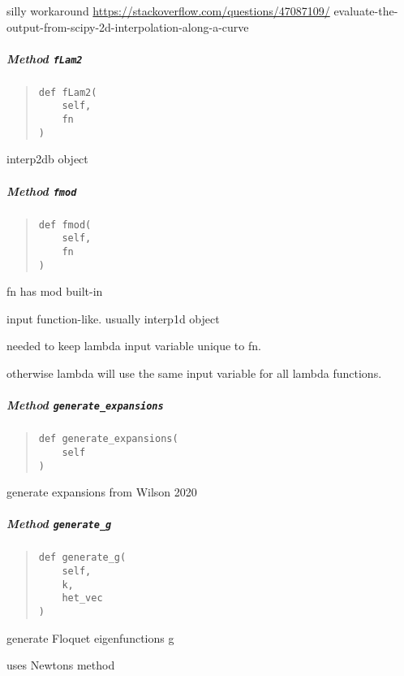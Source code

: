 \documentclass[english,a4paper,oneside]{article}
\let\oldsubparagraph\subparagraph
\renewcommand{\subparagraph}[1]{\oldsubparagraph{#1}\mbox{}}
\begin{document}
silly workaround \url{https://stackoverflow.com/questions/47087109/}
evaluate-the-output-from-scipy-2d-interpolation-along-a-curve

\subparagraph{\texorpdfstring{Method
\texttt{fLam2}}{Method fLam2}}\label{StrongCoupling.StrongCoupling.fLam2}

\begin{quote}
\begin{verbatim}
def fLam2(
    self,
    fn
)
\end{verbatim}
\end{quote}

interp2db object

\subparagraph{\texorpdfstring{Method
\texttt{fmod}}{Method fmod}}\label{StrongCoupling.StrongCoupling.fmod}

\begin{quote}
\begin{verbatim}
def fmod(
    self,
    fn
)
\end{verbatim}
\end{quote}

fn has mod built-in

input function-like. usually interp1d object

needed to keep lambda input variable unique to fn.

otherwise lambda will use the same input variable for all lambda
functions.

\subparagraph{\texorpdfstring{Method
\texttt{generate\_expansions}}{Method generate\_expansions}}\label{StrongCoupling.StrongCoupling.generate_expansions}

\begin{quote}
\begin{verbatim}
def generate_expansions(
    self
)
\end{verbatim}
\end{quote}

generate expansions from Wilson 2020

\subparagraph{\texorpdfstring{Method
\texttt{generate\_g}}{Method generate\_g}}\label{StrongCoupling.StrongCoupling.generate_g}

\begin{quote}
\begin{verbatim}
def generate_g(
    self,
    k,
    het_vec
)
\end{verbatim}
\end{quote}

generate Floquet eigenfunctions g

uses Newtons method
\end{document}
